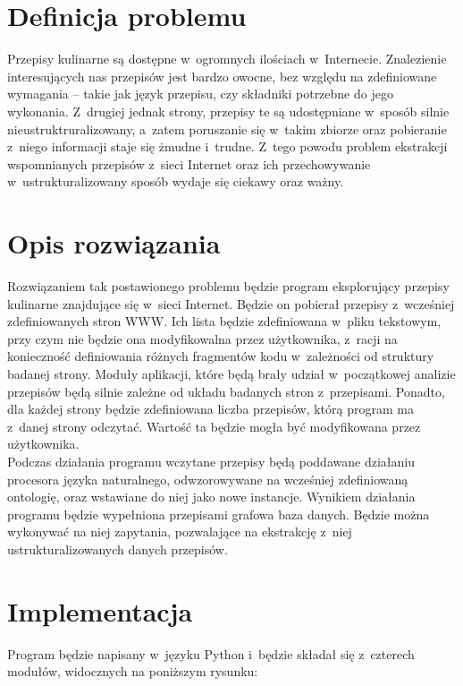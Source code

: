 \documentclass[11pt,a4paper]{article}
\begin{document}
\section{Definicja problemu}
Przepisy kulinarne są dostępne w~ogromnych ilościach w~Internecie. Znalezienie interesujących nas przepisów jest bardzo owocne, bez względu na zdefiniowane wymagania -- takie jak język przepisu, czy składniki potrzebne do jego wykonania. Z~drugiej jednak strony, przepisy te są udostępniane w~sposób silnie nieustruktruralizowany, a~zatem poruszanie się w~takim zbiorze oraz pobieranie z~niego informacji staje się żmudne i~trudne. Z~tego powodu problem ekstrakcji wspomnianych przepisów z~sieci Internet oraz ich przechowywanie w~ustrukturalizowany sposób wydaje się ciekawy oraz ważny.

\section{Opis rozwiązania}
Rozwiązaniem tak postawionego problemu będzie program eksplorujący przepisy kulinarne znajdujące się w~sieci Internet. Będzie on pobierał przepisy z~wcześniej zdefiniowanych stron WWW. Ich lista będzie zdefiniowana w~pliku tekstowym, przy czym nie będzie ona modyfikowalna przez użytkownika, z~racji na konieczność definiowania różnych fragmentów kodu w~zależności od struktury badanej strony. Moduły aplikacji, które będą brały udział w~początkowej analizie przepisów będą silnie zależne od układu badanych stron z~przepisami. Ponadto, dla każdej strony będzie zdefiniowana liczba przepisów, którą program ma z~danej strony odczytać. Wartość ta będzie mogła być modyfikowana przez użytkownika.\\

Podczas działania programu wczytane przepisy będą poddawane działaniu procesora języka naturalnego, odwzorowywane na wcześniej zdefiniowaną ontologię, oraz wstawiane do niej jako nowe instancje. Wynikiem działania programu będzie wypełniona przepisami grafowa baza danych. Będzie można wykonywać na niej zapytania, pozwalające na ekstrakcję z~niej ustrukturalizowanych danych przepisów.

\section{Implementacja}
Program będzie napisany w~języku Python i~będzie składał się z~czterech modułów, widocznych na poniższym rysunku:\\

\end{document}
